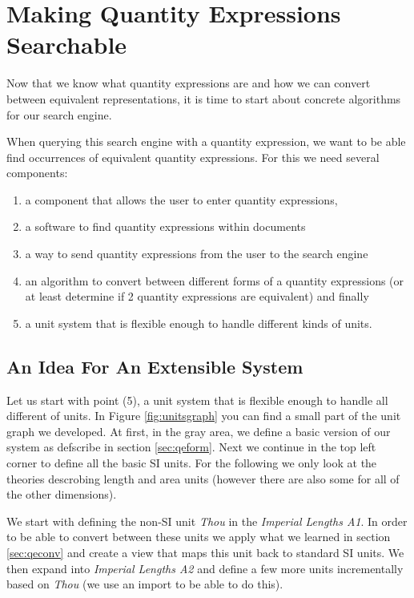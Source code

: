 \section{Making Quantity Expressions Searchable}
\label{sec:mqes}
Now that we know what quantity expressions are and how we can convert between equivalent representations, it is time to start about concrete algorithms for our search engine.

When querying this search engine with a quantity expression, we want to be able find occurrences of equivalent quantity expressions. For this we need several components:
\begin{enumerate}
  \item a component that allows the user to enter quantity expressions,
  \item a software to find quantity expressions within documents
  \item a way to send quantity expressions from the user to the search engine
  \item an algorithm to convert between different forms of a quantity expressions (or at least determine if 2 quantity expressions are equivalent) and finally
  \item a unit system that is flexible enough to handle different kinds of units.
\end{enumerate}

\subsection{An Idea For An Extensible System}
\label{sec:meq_model}

Let us start with point (5), a unit system that is flexible enough to handle all different of units. In Figure \ref{fig:unitsgraph} you can find a small part of the unit graph we developed. At first, in the gray area, we define a basic version of our system as defscribe in section \ref{sec:qeform}. Next we continue in the top left corner to define all the basic SI units. For the following we only look at the theories descrobing length and area units (however there are also some for all of the other dimensions).



We start with defining the non-SI unit \textit{Thou} in the \textit{Imperial Lengths A1}. In order to be able to convert between these units we apply what we learned in section \ref{sec:qeconv} and create a view that maps this unit back to standard SI units. We then expand into \textit{Imperial Lengths A2} and define a few more units incrementally based on \textit{Thou} (we use an import to be able to do this).

